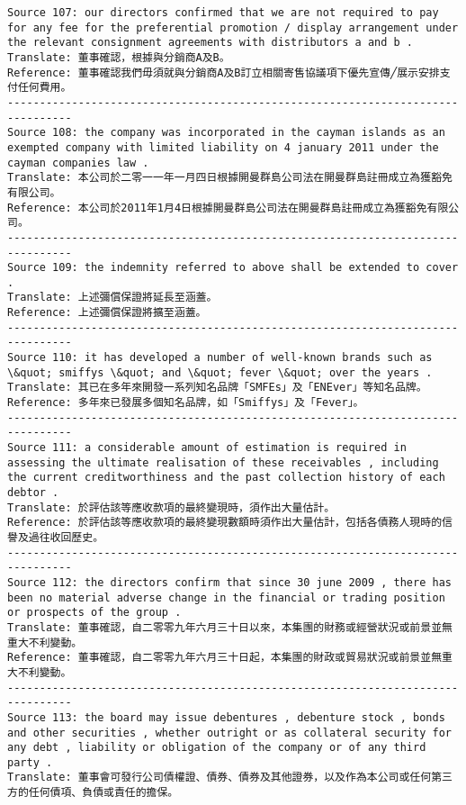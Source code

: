 \documentclass[11pt]{article}
\begin{document}
\begin{Verbatim}[commandchars=\\\{\}]
Source 107: our directors confirmed that we are not required to pay for any fee for the preferential promotion / display arrangement under the relevant consignment agreements with distributors a and b .
Translate: 董事確認，根據與分銷商A及B。
Reference: 董事確認我們毋須就與分銷商A及B訂立相關寄售協議項下優先宣傳╱展示安排支付任何費用。
--------------------------------------------------------------------------------
Source 108: the company was incorporated in the cayman islands as an exempted company with limited liability on 4 january 2011 under the cayman companies law .
Translate: 本公司於二零一一年一月四日根據開曼群島公司法在開曼群島註冊成立為獲豁免有限公司。
Reference: 本公司於2011年1月4日根據開曼群島公司法在開曼群島註冊成立為獲豁免有限公司。
--------------------------------------------------------------------------------
Source 109: the indemnity referred to above shall be extended to cover .
Translate: 上述彌償保證將延長至涵蓋。
Reference: 上述彌償保證將擴至涵蓋。
--------------------------------------------------------------------------------
Source 110: it has developed a number of well-known brands such as \&quot; smiffys \&quot; and \&quot; fever \&quot; over the years .
Translate: 其已在多年來開發一系列知名品牌「SMFEs」及「ENEver」等知名品牌。
Reference: 多年來已發展多個知名品牌，如「Smiffys」及「Fever」。
--------------------------------------------------------------------------------
Source 111: a considerable amount of estimation is required in assessing the ultimate realisation of these receivables , including the current creditworthiness and the past collection history of each debtor .
Translate: 於評估該等應收款項的最終變現時，須作出大量估計。
Reference: 於評估該等應收款項的最終變現數額時須作出大量估計，包括各債務人現時的信譽及過往收回歷史。
--------------------------------------------------------------------------------
Source 112: the directors confirm that since 30 june 2009 , there has been no material adverse change in the financial or trading position or prospects of the group .
Translate: 董事確認，自二零零九年六月三十日以來，本集團的財務或經營狀況或前景並無重大不利變動。
Reference: 董事確認，自二零零九年六月三十日起，本集團的財政或貿易狀況或前景並無重大不利變動。
--------------------------------------------------------------------------------
Source 113: the board may issue debentures , debenture stock , bonds and other securities , whether outright or as collateral security for any debt , liability or obligation of the company or of any third party .
Translate: 董事會可發行公司債權證、債券、債券及其他證券，以及作為本公司或任何第三方的任何債項、負債或責任的擔保。

\end{Verbatim}
\end{document}
